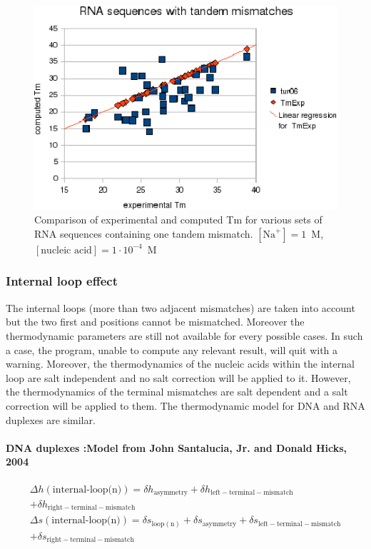 \documentclass{article}
\begin{document}
\begin{figure}[h]
\includegraphics[width=1\linewidth]{images/RNATandemMismatch}
\caption{Comparison of experimental and computed Tm for various sets of
 RNA sequences containing one tandem mismatch. $[\mbox{Na}^+] = 1$~M, $[\mbox{nucleic acid}] = 1\cdot{}10^{-4}$~M}
\end{figure}

\clearpage
\subsubsection{Internal loop effect}

The internal loops (more than two adjacent mismatches) are taken into account but the two first and positions cannot
be mismatched. Moreover the thermodynamic parameters are still not available for every possible cases.
In such a case, the program, unable to compute any relevant result, will quit with a warning.
Moreover, the thermodynamics of the nucleic acids within the internal loop are salt 
independent and no salt correction will be applied to it. However, the thermodynamics
of the terminal mismatches are salt dependent and a salt correction will be applied
to them.
The thermodynamic model for DNA and RNA duplexes are similar.

\paragraph{DNA duplexes :\textbf{Model from John Santalucia, Jr. and Donald Hicks, 2004}} 

\begin{multline*}
\Delta h {(\mbox{internal-loop(n)})} =
\delta{}h_\mathrm{asymmetry} +
\delta{}h_\mathrm{left-terminal-mismatch} \\ +
\delta{}h_\mathrm{right-terminal-mismatch}\\
\Delta s {(\mbox{internal-loop(n)})} =
\delta{}s_\mathrm{loop(n)} +
\delta{}s_\mathrm{asymmetry} +
\delta{}s_\mathrm{left-terminal-mismatch} \\ +
\delta{}s_\mathrm{right-terminal-mismatch}\\
\end{multline*}
\end{document}
